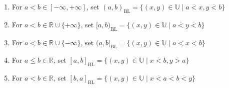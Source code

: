 \documentclass[11pt]{article}
\theoremstyle{remark}
\newcommand{\U}{\mathbb{U}}
\newcommand{\R}{\mathbb{R}}
\begin{document}
\begin{enumerate}
    \item For $a<b\in [-\infty,+\infty]$, set $(a,b)_{\mathrm{BL}}=\{(x,y)\in\U\mid a\overline{<}x,y \overline{<}    b\}$
    \item For $a<b\in \R\cup\{+\infty\}$, set $[a,b)_{\mathrm{BL}}=\{(x,y)\in\U\mid a\overline{<} y \overline{<} b\}$
    \item For $a<b\in \R\cup\{-\infty\}$, set $(a,b]_{\mathrm{BL}}=\{(x,y)\in\U\mid a \overline{<} x \overline{<} b\}$
    \item For $a\leq b\in \R$, set $[a,b]_{\mathrm{BL}}=\{(x,y)\in\U\mid x \overline{<} b,y\overline{>} a\}$
    \item For $a<b\in\R$, set $[b,a]_{\mathrm{BL}}=\{(x,y)\in\U\mid x\overline{<} a \overline{<} b \overline{<} y\}$
\end{enumerate}
\end{document}
